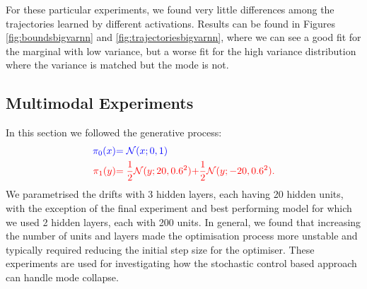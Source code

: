 \documentclass[a4paper,12pt,twoside,openright]{report}
\theoremstyle{definition}
\begin{document}
For these particular experiments, we found very little differences among the trajectories learned by different activations. Results can be found in Figures \ref{fig:boundsbigvarnn} and \ref{fig:trajectoriesbigvarnn}, where we can see a good fit for the marginal with low variance, but a worse fit for the high variance distribution where the variance is matched but the mode is not.
\subsection{Multimodal Experiments}
In this section we followed the generative process:
\begin{align*}
     \color{blue}{\pi_0(x)} &\color{blue}{= {\mathcal{N}}(x; 0,  1)} \\
    \color{red}{\pi_1(y)} &\color{red}{= \frac{1}{2}{\mathcal{N}}(y; 20, 0.6 ^2)}\color{red}{ + \frac{1}{2}{\mathcal{N}}(y; -20, 0.6 ^2) }.
\end{align*}
We parametrised the drifts with 3 hidden layers, each having 20 hidden units, with the exception of the final experiment and best performing model for which we used 2 hidden layers, each with 200 units. In general, we found that increasing the number of units and layers made the optimisation process more unstable and typically required reducing the initial step size for the optimiser. These experiments are used for investigating how the stochastic control based approach can handle mode collapse.
\end{document}
